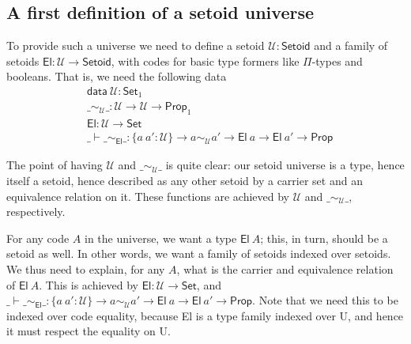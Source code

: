 \documentclass{easychair}
\newcommand{\setoidU}{\mathcal{U}}
\newcommand{\ad}[1]{\AgdaFunction{#1}}
\newcommand{\Set}{\textsf{Set}}
\newcommand{\Prop}{\textsf{Prop}}
\newcommand{\Setoid}{\textsf{Setoid}}
\newcommand{\U}{\textsf{U}}
\newcommand{\El}{\textsf{El}}
\providecommand\mathbbm{\mathbb}
\begin{document}


\subsection{A first definition of a setoid universe}

To provide such a universe we need to define a setoid $\setoidU : \Setoid$ and a
family of setoids $\El : \setoidU \to \Setoid$, with codes for basic type
formers like $\Pi$-types and booleans. That is, we need the following data
%
\begin{align*}
  & \textsf{data} \ \setoidU : \Set_1 \\
  & \_\sim_\setoidU\_ : \setoidU \to \setoidU \to \Prop_1 \\
  & \El : \setoidU \to \Set \\
  & \_\vdash\_\sim_\El\_ : \{a\ a' : \setoidU\} \to a \sim_\setoidU a' \to \El\ a \to \El\ a' \to \Prop
\end{align*}

The point of having $\setoidU$ and $\_\sim_\setoidU\_$ is quite clear: our
setoid universe is a type, hence itself a setoid, hence described as any other
setoid by a carrier set and an equivalence relation on it. These functions are
achieved by $\setoidU$ and $\_\sim_{\setoidU}\_$, respectively.

For any code $A$ in the universe, we want a type $\El\ A$; this, in turn, should
be a setoid as well. In other words, we want a family of setoids indexed over
setoids. We thus need to explain, for any $A$, what is the carrier and
equivalence relation of $\El\ A$. This is achieved by $\El : \setoidU \to \Set$,
and $\_\vdash\_\sim_\El\_ : \{a\ a' : \setoidU\} \to a \sim_\setoidU a' \to
\El\ a \to \El\ a' \to \Prop$. Note that we need this to be indexed over code
equality, because El is a type family indexed over U, and hence it must respect
the equality on U. 
\end{document}
